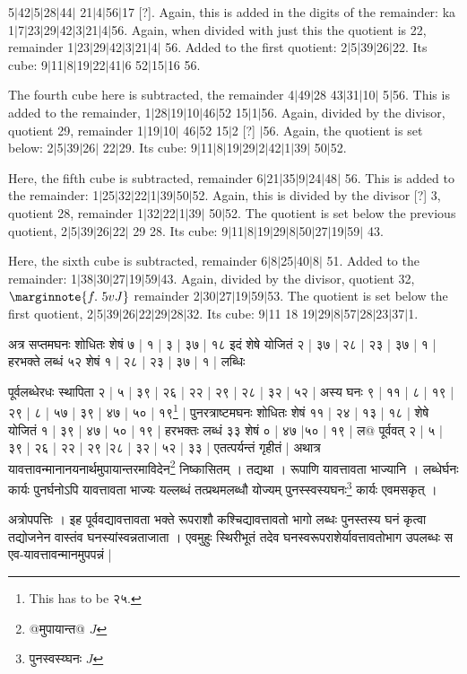 \documentclass[12pt]{book}
\def\danda{$|$}
\begin{document}
5\danda 42\danda 5\danda 28\danda 44\danda
21\danda 4\danda 56\danda 17 [?]. Again, this is added in the digits of the remainder: ka
1\danda 7\danda 23\danda 29\danda 42\danda 3\danda 21\danda 4\danda 56. Again, when divided with
just this the quotient is 22, remainder 1\danda 23\danda 29\danda 42\danda 3\danda 21\danda 4\danda
56.  Added to the first quotient: 2\danda 5\danda 39\danda 26\danda 22. Its cube:
9\danda 11\danda 8\danda 19\danda 22\danda 41\danda 6 52\danda 15\danda 16 56.

The fourth cube here is subtracted, the remainder 4\danda 49\danda 28 43\danda 31\danda 10\danda
5\danda 56. This is added to the remainder, 1\danda 28\danda 19\danda 10\danda 46\danda 52
15\danda 1\danda 56. Again, divided by the divisor, quotient 29, remainder 1\danda 19\danda 10\danda
46\danda 52 15\danda 2 [?] \danda 56. Again, the quotient is set below: 2\danda 5\danda 39\danda 26\danda
22\danda 29. Its cube: 9\danda 11\danda 8\danda 19\danda 29\danda 2\danda 42\danda 1\danda 39\danda
50\danda 52. 

Here, the fifth cube is subtracted, remainder 6\danda 21\danda 35\danda 9\danda 24\danda 48\danda
56. This is added to the remainder: 1\danda 25\danda 32\danda 22\danda 1\danda 39\danda 50\danda 52.
Again, this is divided by the divisor [?] 3, quotient 28, remainder 1\danda 32\danda 22\danda 1\danda 39\danda
50\danda 52. The quotient is set below the previous quotient, 2\danda 5\danda 39\danda 26\danda 22\danda
29 28. Its cube: 9\danda 11\danda 8\danda 19\danda 29\danda 8\danda 50\danda 27\danda 19\danda 59\danda
43. 

Here, the sixth cube is subtracted, remainder 6\danda 8\danda 25\danda 40\danda 8\danda
51. Added to the remainder: 1\danda 38\danda 30\danda 27\danda 19\danda 59\danda 43. Again, divided 
by the divisor, quotient 32,
$\marginnote{f.~5v J}$
remainder 2\danda 30\danda 27\danda 19\danda 59\danda 53. The quotient is set below the first
quotient, 2\danda 5\danda 39\danda 26\danda 22\danda 29\danda 28\danda 32. Its cube: 
9\danda 11 18 19\danda 29\danda 8\danda 57\danda 28\danda 23\danda 37\danda 1.

\newpage


{\s अत्र सप्तमघनः शोधितः शेषं ७ | १ | ३ | ३७ | १८ इदं शेषे योजितं २ | ३७ | २८ | २३ | ३७ | १ | हरभक्ते लब्धं ५२ शेषं १ | २८ | २३ | ३७ | १ | लब्धिः

पूर्वलब्धेरधः स्थापिता २ | ५ | ३९ | २६ | २२ | २९ | २८ | ३२ | ५२ | अस्य घनः ९ | ११ | ८ | १९ | २९ | ८ | ५७ | ३९ | ४७ | ५० | १९\footnote{This has to be {\s २५}.} | पुनरत्राष्टमघनः शोधितः शेषं ११ | २४ | १३ | १८ |
शेषे योजितं १ | ३९ | ४७ | ५० | १९ | हरभक्तः लब्धं ३३ शेषं ० | ४७ |५० | १९ | 
ल@
पूर्ववत् २ | ५ | ३९ | २६ | २२ | २९ |२८ | ३२ | ५२ | ३३ | एतत्पर्यन्तं गृहीतं | अथात्र यावत्तावन्मानानयनार्थमुपायान्तरमाविदेन\footnote{{\s @मुपायान्त@} $J$} निष्कासितम् । तद्यथा । रूपाणि यावत्तावता भाज्यानि । लब्धेर्घनः कार्यः पुनर्घनोऽपि यावत्तावता भाज्यः यल्लब्धं तत्प्रथमलब्धौ योज्यम् पुनस्स्वस्यघनः\footnote{{\s पुनस्वस्य्घनः} $J$} कार्यः एवमसकृत् । 

अत्रोपपत्तिः ।
इह पूर्ववद्यावत्तावता भक्ते रूपराशौ कश्चिद्यावत्तावतो भागो लब्धः पुनस्तस्य घनं कृत्वा
तद्योजनेन वास्तंव घनस्यांस्वन्नताजाता । एवमुहुः स्थिरीभूतं तदेव घनस्वरूपराशेर्यावत्तावतोभाग उपलब्धः स एव-यावत्तावन्मानमुपपन्नं |}
\end{document}
